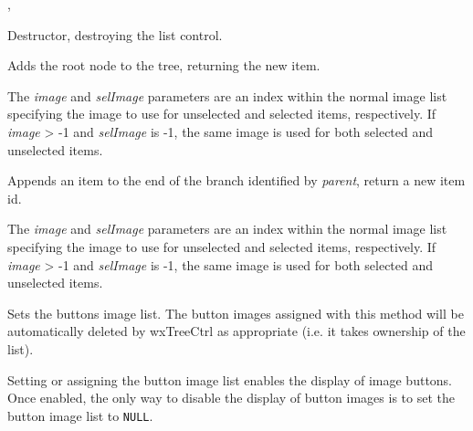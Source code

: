 
, 


\label{wxtreectrldtor}


Destructor, destroying the list control.


\label{wxtreectrladdroot}


Adds the root node to the tree, returning the new item.

The {\it image} and {\it selImage} parameters are an index within
the normal image list specifying the image to use for unselected and
selected items, respectively.
If {\it image} > -1 and {\it selImage} is -1, the same image is used for
both selected and unselected items.


\label{wxtreectrlappenditem}


Appends an item to the end of the branch identified by {\it parent}, return a new item id.

The {\it image} and {\it selImage} parameters are an index within
the normal image list specifying the image to use for unselected and
selected items, respectively.
If {\it image} > -1 and {\it selImage} is -1, the same image is used for
both selected and unselected items.


\label{wxtreectrlassignbuttonsimagelist}


Sets the buttons image list. The button images assigned with this method will
be automatically deleted by wxTreeCtrl as appropriate
(i.e. it takes ownership of the list).

Setting or assigning the button image list enables the display of image buttons.
Once enabled, the only way to disable the display of button images is to set
the button image list to {\tt NULL}.

